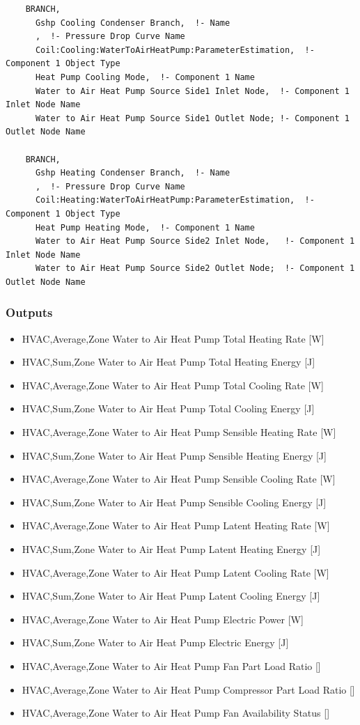 \begin{lstlisting}
    BRANCH,
      Gshp Cooling Condenser Branch,  !- Name
      ,  !- Pressure Drop Curve Name
      Coil:Cooling:WaterToAirHeatPump:ParameterEstimation,  !- Component 1 Object Type
      Heat Pump Cooling Mode,  !- Component 1 Name
      Water to Air Heat Pump Source Side1 Inlet Node,  !- Component 1 Inlet Node Name
      Water to Air Heat Pump Source Side1 Outlet Node; !- Component 1 Outlet Node Name

    BRANCH,
      Gshp Heating Condenser Branch,  !- Name
      ,  !- Pressure Drop Curve Name
      Coil:Heating:WaterToAirHeatPump:ParameterEstimation,  !- Component 1 Object Type
      Heat Pump Heating Mode,  !- Component 1 Name
      Water to Air Heat Pump Source Side2 Inlet Node,   !- Component 1 Inlet Node Name
      Water to Air Heat Pump Source Side2 Outlet Node;  !- Component 1 Outlet Node Name
\end{lstlisting}

\subsubsection{Outputs}\label{outputs-9-009}

\begin{itemize}
\item
  HVAC,Average,Zone Water to Air Heat Pump Total Heating Rate {[}W{]}
\item
  HVAC,Sum,Zone Water to Air Heat Pump Total Heating Energy {[}J{]}
\item
  HVAC,Average,Zone Water to Air Heat Pump Total Cooling Rate {[}W{]}
\item
  HVAC,Sum,Zone Water to Air Heat Pump Total Cooling Energy {[}J{]}
\item
  HVAC,Average,Zone Water to Air Heat Pump Sensible Heating Rate {[}W{]}
\item
  HVAC,Sum,Zone Water to Air Heat Pump Sensible Heating Energy {[}J{]}
\item
  HVAC,Average,Zone Water to Air Heat Pump Sensible Cooling Rate {[}W{]}
\item
  HVAC,Sum,Zone Water to Air Heat Pump Sensible Cooling Energy {[}J{]}
\item
  HVAC,Average,Zone Water to Air Heat Pump Latent Heating Rate {[}W{]}
\item
  HVAC,Sum,Zone Water to Air Heat Pump Latent Heating Energy {[}J{]}
\item
  HVAC,Average,Zone Water to Air Heat Pump Latent Cooling Rate {[}W{]}
\item
  HVAC,Sum,Zone Water to Air Heat Pump Latent Cooling Energy {[}J{]}
\item
  HVAC,Average,Zone Water to Air Heat Pump Electric Power {[}W{]}
\item
  HVAC,Sum,Zone Water to Air Heat Pump Electric Energy {[}J{]}
\item
  HVAC,Average,Zone Water to Air Heat Pump Fan Part Load Ratio {[]}
\item
  HVAC,Average,Zone Water to Air Heat Pump Compressor Part Load Ratio {[]}
\item
  HVAC,Average,Zone Water to Air Heat Pump Fan Availability Status {[]}
\end{itemize}

